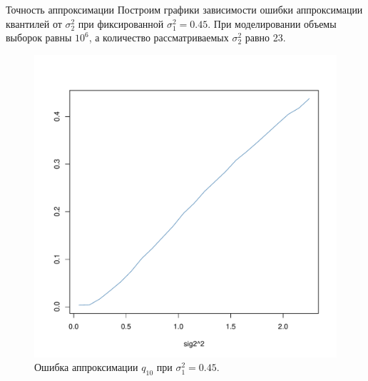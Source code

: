 \documentclass[ucs, notheorems, handout]{beamer}
\begin{document}
\begin{frame}{Точность аппроксимации }
	Построим графики зависимости ошибки аппроксимации квантилей от $\sigma_{2}^{2}$ при фиксированной $\sigma_{1}^{2} = 0.45$. При моделировании объемы выборок равны $10^{6}$, а количество рассматриваемых $\sigma_{2}^{2}$ равно 23.
	\begin{figure}[h]
		\begin{center}
			\begin{minipage}[h]{0.45\linewidth}
				\includegraphics[width=1\linewidth]{gr_new_2.pdf}
				\caption{Ошибка аппроксимации $q_{10}$ при $\sigma_{1}^{2} = 0.45$.} %
				\label{ris7} %
			\end{minipage}
		\end{center}
	\end{figure}	
\end{frame}
\end{document}
